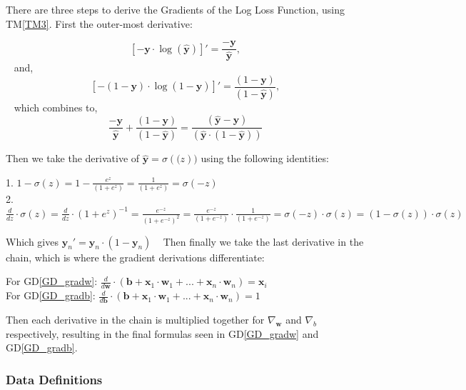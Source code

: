 \documentclass[12pt]{article}
\newcommand{\dref}[1]{GD\ref{#1}}
\newcommand{\tref}[1]{TM\ref{#1}}
\begin{document}
There are three steps to derive the Gradients of the Log Loss Function, using \tref{TM3}. First the outer-most derivative:
\begin{center}
  $$
    [-\mathbf{y} \cdot \log(\mathbf{\hat{y}})]' = \frac{-\mathbf{y}}{\mathbf{\hat{y}}},
  $$
  ~\newline
    and, 
    ~\newline
    $$
    [-(1 - \mathbf{y}) \cdot \log(1 - \mathbf{\hat{y}})]' = \frac{(1 - \mathbf{y})}{(1 - \mathbf{\hat{y}})}, 
    $$
    ~\newline
    which combines to,
    ~\newline
    $$
    \frac{-\mathbf{y}}{\mathbf{\hat{y}}} + \frac{(1 - \mathbf{y})}{(1 - \mathbf{\hat{y}})} = \frac{(\mathbf{\hat{y}} - \mathbf{y})}{(\mathbf{\hat{y}} \cdot (1 - \mathbf{\hat{y}}))}
    $$
\end{center}
Then we take the derivative of $\mathbf{\hat{y}} = \sigma(\mathbf(z))$ using the following identities:
\begin{center}
1. $ 1 - \sigma(z) = 1 - \frac{e^z}{(1 + e^z)} = \frac{1}{(1 + e^z)} = \sigma(-z)$\\
2.$ \frac{d}{dz} \cdot \sigma(z) = \frac{d}{dz} \cdot (1 + e^z)^{-1} = \frac{e^{-z}}{(1 + e^{-z})^2} = \frac{e^{-z}}{(1 + e^{-z})} \cdot \frac{1}{(1 + e^{-z})} = \sigma(-z) \cdot \sigma(z) = (1 - \sigma(z)) \cdot \sigma(z) $
\end{center}
Which gives $ \mathbf{y}_n' = \mathbf{y}_n \cdot (1 - \mathbf{y}_n)$
~\newline
Then finally we take the last derivative in the chain, which is where the gradient derivations differentiate:
\begin{center}
For \dref{GD_gradw}: $ \frac{d}{d\mathbf{w}} \cdot (\mathbf{b} + \mathbf{x}_1 \cdot \mathbf{w}_1 + ... +\mathbf{x}_n \cdot \mathbf{w}_n) = \mathbf{x}_i$ \\
For \dref{GD_gradb}: $\frac{d}{d\mathbf{b}} \cdot (\mathbf{b} + \mathbf{x}_1 \cdot \mathbf{w}_1 + ... +\mathbf{x}_n \cdot \mathbf{w}_n) = 1 $
\end{center}

Then each derivative in the chain is multiplied together for $\nabla_\mathbf{w}$ and $\nabla_b$ respectively, resulting in
the final formulas seen in \dref{GD_gradw} and \dref{GD_gradb}. 


\subsubsection{Data Definitions}\label{sec_datadef}
\end{document}
